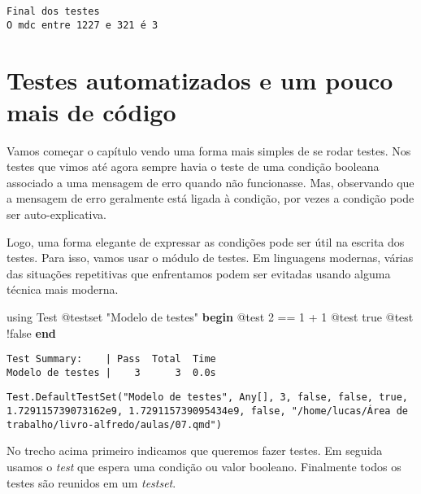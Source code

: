 \documentclass[
  letterpaper,
  DIV=11,
  numbers=noendperiod]{scrreprt}
\newenvironment{Shaded}{\begin{snugshade}}{\end{snugshade}}
\newcommand{\BuiltInTok}[1]{\textcolor[rgb]{0.00,0.23,0.31}{#1}}
\newcommand{\ConstantTok}[1]{\textcolor[rgb]{0.56,0.35,0.01}{#1}}
\newcommand{\ControlFlowTok}[1]{\textcolor[rgb]{0.00,0.23,0.31}{\textbf{#1}}}
\newcommand{\FloatTok}[1]{\textcolor[rgb]{0.68,0.00,0.00}{#1}}
\newcommand{\ImportTok}[1]{\textcolor[rgb]{0.00,0.46,0.62}{#1}}
\newcommand{\NormalTok}[1]{\textcolor[rgb]{0.00,0.23,0.31}{#1}}
\newcommand{\OperatorTok}[1]{\textcolor[rgb]{0.37,0.37,0.37}{#1}}
\newcommand{\PreprocessorTok}[1]{\textcolor[rgb]{0.68,0.00,0.00}{#1}}
\newcommand{\StringTok}[1]{\textcolor[rgb]{0.13,0.47,0.30}{#1}}
\begin{document}
\begin{verbatim}
Final dos testes
O mdc entre 1227 e 321 é 3
\end{verbatim}


\chapter{Testes automatizados e um pouco mais de
código}\label{testes-automatizados-e-um-pouco-mais-de-cuxf3digo}

Vamos começar o capítulo vendo uma forma mais simples de se rodar
testes. Nos testes que vimos até agora sempre havia o teste de uma
condição booleana associado a uma mensagem de erro quando não
funcionasse. Mas, observando que a mensagem de erro geralmente está
ligada à condição, por vezes a condição pode ser auto-explicativa.

Logo, uma forma elegante de expressar as condições pode ser útil na
escrita dos testes. Para isso, vamos usar o módulo de testes. Em
linguagens modernas, várias das situações repetitivas que enfrentamos
podem ser evitadas usando alguma técnica mais moderna.

\begin{Shaded}
\begin{Highlighting}[]
\ImportTok{using} \BuiltInTok{Test}  
\PreprocessorTok{@testset} \StringTok{"Modelo de testes"} \ControlFlowTok{begin}
    \PreprocessorTok{@test} \FloatTok{2} \OperatorTok{==} \FloatTok{1} \OperatorTok{+} \FloatTok{1}
    \PreprocessorTok{@test} \ConstantTok{true}
    \PreprocessorTok{@test}\NormalTok{ !}\ConstantTok{false}
\ControlFlowTok{end}
\end{Highlighting}
\end{Shaded}

\begin{verbatim}
Test Summary:    | Pass  Total  Time
Modelo de testes |    3      3  0.0s
\end{verbatim}

\begin{verbatim}
Test.DefaultTestSet("Modelo de testes", Any[], 3, false, false, true, 1.729115739073162e9, 1.729115739095434e9, false, "/home/lucas/Área de trabalho/livro-alfredo/aulas/07.qmd")
\end{verbatim}

No trecho acima primeiro indicamos que queremos fazer testes. Em seguida
usamos o \emph{test} que espera uma condição ou valor booleano.
Finalmente todos os testes são reunidos em um \emph{testset}.
\end{document}
